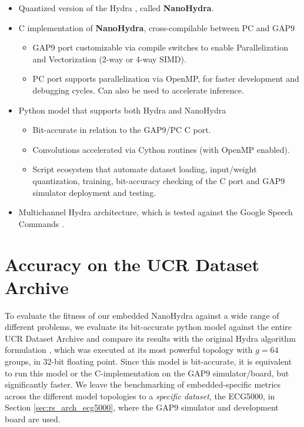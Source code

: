 \begin{itemize}
    \item Quantized version of the Hydra \cite{Dempster2023Hydra}, called \textbf{NanoHydra}.
    \item C implementation of \textbf{NanoHydra}, cross-compilable between PC and GAP9
        \begin{itemize}
            \item GAP9 port customizable via compile switches to enable Parallelization and Vectorization (2-way or 4-way SIMD).
            \item PC port supports parallelization via OpenMP, for faster development and debugging cycles. Can also be used to accelerate inference.
        \end{itemize}
    \item Python model that supports both Hydra and NanoHydra
        \begin{itemize}
            \item Bit-accurate in relation to the GAP9/PC C port.
            \item Convolutions accelerated via Cython routines (with OpenMP enabled).
            \item Script ecosystem that automate dataset loading, input/weight quantization, training, bit-accuracy checking of the C port and GAP9 simulator deployment and testing.
        \end{itemize}
    \item Multichannel Hydra architecture, which is tested against the Google Speech Commands \cite{Warden2018}.
\end{itemize}

\section{Accuracy on the UCR Dataset Archive}\label{sec:rs_acc_ucr}
To evaluate the fitness of our embedded NanoHydra against a wide range of different problems, we evaluate its bit-accurate python model against the entire UCR Dataset Archive and
compare its results with the original Hydra algorithm formulation \cite{Dempster2023Hydra}, which was executed at its most powerful topology with $g=64$ groups, in 32-bit floating point.
Since this model is bit-accurate, it is equivalent to run this model or the C-implementation on the GAP9 simulator/board, but significantly faster. We leave the benchmarking of embedded-specific metrics
across the different model topologies to a \emph{specific dataset}, the ECG5000, in Section \ref{sec:rs_arch_ecg5000}, where the GAP9 simulator and development board are used.

